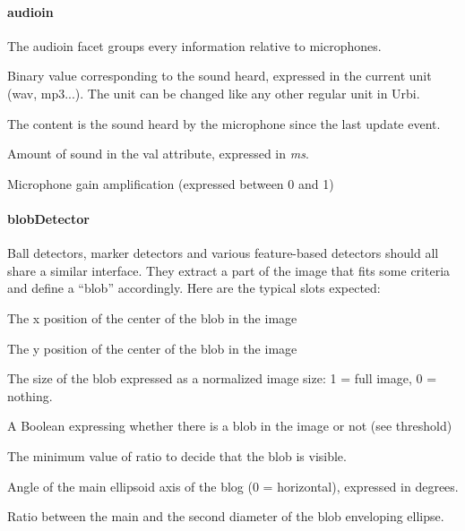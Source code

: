 \paragraph{audioin}

The audioin facet groups every information relative to microphones.

\begin{slots}
  {%
    Binary value corresponding to the
sound heard, expressed in the current unit (wav, mp3...). The unit can
be changed like any other regular unit in Urbi.

The content is the sound heard by the microphone since the last update
event.%
}

%
{%
  Amount of sound in the val attribute, expressed in \textit{ms}.%
}

%
{%
  Microphone gain amplification (expressed between 0 and 1)%
}

\end{slots}


\paragraph{blobDetector}

Ball detectors, marker detectors and various feature-based detectors
should all share a similar interface. They extract a part of the image
that fits some criteria and define a “blob” accordingly. Here are the
typical slots expected:

\begin{slots}
  {%
    The x position of the center of the blob in the image%
  }

  {%
    The y position of the center of the blob in the image%
  }

  {%
    The size of the blob expressed as a normalized image size: 1 =
    full image, 0 = nothing.%
  }

  {%
    A Boolean expressing whether there is a blob in the image or not
    (see threshold)%
  }

  {%
    The minimum value of ratio to decide that the blob is visible.%
  }

  {%
    Angle of the main ellipsoid axis of the blog (0 = horizontal),
    expressed in degrees.%
  }

  {%
    Ratio between the main and the second diameter of the blob
    enveloping ellipse.%
  }

\end{slots}

